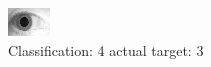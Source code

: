 \begin{figure}[h!]
\begin{center}
\includegraphics[width=0.60\columnwidth]{figures/ID1859_class_4_target_3.png}
\end{center}
\caption{ Classification: 4 actual target: 3}
\label{fig:ID1859_class_4_target_3}
\end{figure}
